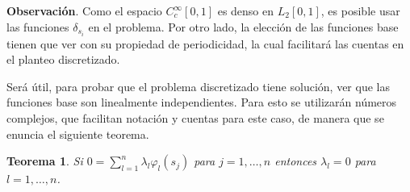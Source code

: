\documentclass[a4paper,10pt]{book}
\newtheorem{teo}{Teorema}%
\begin{document}
\textbf{Observación}. Como el espacio $C_c^\infty[0,1]$ es denso en $L_2[0,1]$, es posible usar las funciones $\delta_{s_i}$ en el problema.
Por otro lado, la elección de las funciones base tienen que ver con su propiedad de periodicidad, la cual facilitará las cuentas en el planteo discretizado.

Será útil, para probar que el problema discretizado tiene solución, ver que las funciones base son linealmente independientes. Para esto se utilizarán números complejos, que facilitan notación y cuentas para este caso, de manera que se enuncia el siguiente teorema.

\begin{teo}
Si $0=\displaystyle\sum_{l=1}^n\lambda_l\varphi_l(s_j)$ para $j=1,\ldots,n$ entonces $\lambda_l=0$ para $l=1,\ldots,n$.
\end{teo}
\end{document}
